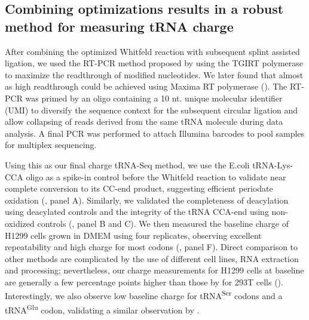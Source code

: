 \documentclass[9pt,lineno]{elife}
\begin{document}
\subsection{Combining optimizations results in a robust method for measuring tRNA charge}
After combining the optimized Whitfeld reaction with subsequent splint assisted ligation, we used the RT-PCR method proposed by \cite{Behrens2021-gb} using the TGIRT polymerase \citep{Mohr2013-hu} to maximize the readthrough of modified nucleotides.
We later found that almost as high readthrough could be achieved using Maxima RT polymerase ().
The RT-PCR was primed by an oligo containing a 10 nt. unique molecular identifier (UMI) to diversify the sequence context for the subsequent circular ligation and allow collapsing of reads derived from the same tRNA molecule during data analysis.
A final PCR was performed to attach Illumina barcodes to pool samples for multiplex sequencing.

Using this as our final charge tRNA-Seq method, we use the E.coli tRNA-Lys-CCA oligo as a spike-in control before the Whitfeld reaction to validate near complete conversion to its CC-end product, suggesting efficient periodate oxidation (, panel A).
Similarly, we validated the completeness of deacylation using deacylated controls and the integrity of the tRNA CCA-end using non-oxidized controls (, panel B and C).
We then measured the baseline charge of H1299 cells grown in DMEM using four replicates, observing excellent repeatability and high charge for most codons (, panel F).
Direct comparison to other methods are complicated by the use of different cell lines, RNA extraction and processing; nevertheless, our charge measurements for H1299 cells at baseline are generally a few percentage points higher than those by \cite{Evans2017-st} for 293T cells ().
Interestingly, we also observe low baseline charge for tRNA\textsuperscript{Ser} codons and a tRNA\textsuperscript{Glu} codon, validating a similar observation by \cite{Evans2017-st}.
\end{document}
